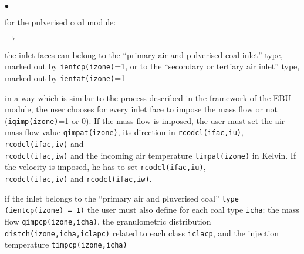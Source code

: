 {{\begin{list}{$\bullet$}{}
       \item for the pulverised coal module:
             \begin{list}{$\rightarrow$}{}
                    \item the inlet faces can belong to the ``primary
                          air and pulverised coal inlet'' type, marked
                          out by \texttt{ientcp(izone)}=1, or to
                          the ``secondary or tertiary air inlet'' type,
                          marked out by \texttt{ientat(izone)}=1
                    \item in a way which is similar to the process
                          described in the framework of the EBU module,
                          the user chooses for every inlet face to
                          impose the mass flow or not (\texttt{iqimp(izone)}=1 or
                          0). If the mass flow is imposed, the user
                          must set the air mass flow value
                          \texttt{qimpat(izone)}, its direction in
                          \texttt{rcodcl(ifac,iu)}, \texttt{rcodcl(ifac,iv)}
                          and \\ \texttt{rcodcl(ifac,iw)} and the incoming
                          air temperature \texttt{timpat(izone)} in
                          Kelvin. If the velocity is imposed, he has to
                          set  \texttt{rcodcl(ifac,iu)}, \\
                          \texttt{rcodcl(ifac,iv)} and \texttt{rcodcl(ifac,iw)}.

                    \item if the inlet belongs to the ``primary air and
                          pluverised coal'' \texttt{type (ientcp(izone) = 1)} the
                          user must also define for each coal type \texttt{icha}:
                          the mass flow
                          \texttt{qimpcp(izone,icha)}, the
                          granulometric distribution
                          \texttt{distch(izone,icha,iclapc)}
                          related to each class \texttt{iclacp}, and the
                          injection temperature
                          \texttt{timpcp(izone,icha)}

             \end{list}
\end{list}

}}
